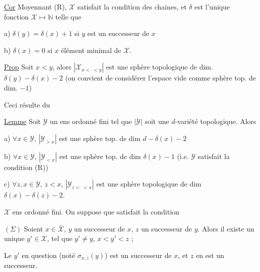 \uline{Cor} Moyennant (R), $\mathcal X$ satisfait la condition
des chaines, et $\delta$ est l'unique fonction
$\mathcal X\mapsto\mathbb N$ telle que

a) $\delta(y)=\delta(x)+1$ si $y$ est un successeur de $x$

b) $\delta(x)=0$ si $x$ élément minimal de $\mathcal X$.

\uline{Prop}  Soit $x<y$, alors $|\mathcal X_{x<\cdot<y}|$ est une
sphère topologique de dim. $\delta(y)-\delta(x)-2$
(on convient de considérer l'espace vide comme
sphère top. de dim. $-1$)

Ceci résulte du

\uline{Lemme} Soit $\mathcal Y$ un ens ordonné fini tel que
$|\mathcal Y|$ soit une $d$-variété topologique. Alors

a) $\forall x\in\mathcal Y$, $|\mathcal Y_{>x}|$ est une sphère top. de
dim $d-\delta(x)-2$

b) $\forall x\in\mathcal Y$, $|\mathcal Y_{<x}|$ est une sphère top.
de dim $\delta(x)-1$ (i.e. $\mathcal Y$ satisfait la
condition (R))

c) $\forall z,x\in\mathcal Y$, $z<x$, $|\mathcal Y_{z<\,\,<x}|$
 est une sphère topologique de dim
$\delta(x)-\delta(z)-2$.

$\mathcal X$ ens ordonné fini. On suppose que  satisfait la condition

$(\Sigma)$ Soient $x\in\bar{\mathcal X}$, $y$ un successeur de $x$, $z$ un successeur de $y$. Alors il existe un unique $y'\in \mathcal X$, tel que $y'\ne y$, $x<y'<z$ ; 

Le $y'$ en question (noté $\sigma_{x,z}(y)$) est un successeur de $x$, et $z$ en est un successeur.

\diagram{\begin{tikzcd}[ampersand replacement=\&,row sep=tiny,column sep=tiny]
\&\deleted{\bullet}\arrow[dr]\&\\
\&\&\deleted{\bullet}\arrow[dr]\\
\deleted{\bullet}\arrow[uur]\arrow[r]\&\deleted{\bullet}\arrow[rr]\&\&\deleted{\bullet}
\end{tikzcd}}


